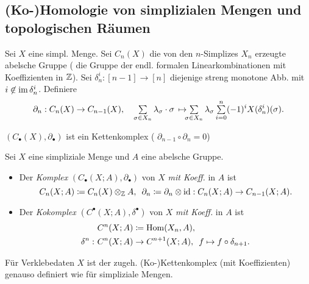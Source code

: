 \documentclass{cheat-sheet}
\newcommand{\nspace}[1]{\foreach \i in {1,...,#1}{ \! }} %
\begin{document}
\begin{samepage}
  \subsection{(Ko-)Homologie von simplizialen Mengen und topologischen Räumen}
\end{samepage}

\begin{defn}
  Sei $X$ eine simpl. Menge. Sei $C_n(X)$ die von den $n$-Simplizes $X_n$ erzeugte abelsche Gruppe (\dh{} die Gruppe der endl. formalen Linearkombinationen mit Koeffizienten in $\mathbb{Z}$). Sei $\delta_n^i : [n{-}1] \to [n]$ diejenige streng monotone Abb. mit $i \not\in \operatorname{im} \delta_n^i$. Definiere
  \[
    \partial_n : C_n(X) \to C_{n-1}(X), \quad
    \sum_{\sigma \in X_n} \lambda_\sigma \cdot \sigma \, \mapsto \nspace{3} \sum_{\sigma \in X_n} \lambda_\sigma \sum_{i=0}^n (-1)^i X(\delta_n^i)(\sigma).
  \]
\end{defn}

\begin{prop}
  $(C_\bullet(X),\partial_\bullet)$ ist ein Kettenkomplex (\dh{} $\partial_{n-1} \circ \partial_n = 0$)
\end{prop}

\begin{defn}
  Sei $X$ eine simpliziale Menge und $A$ eine abelsche Gruppe.
  \begin{itemize}
    \item Der \emph{Komplex} $(C_\bullet(X; A), \partial_\bullet)$ von $X$ \emph{mit Koeff.} in $A$ ist
    \[
      C_n(X; A) \coloneqq C_n(X) \otimes_{\mathbb{Z}} A, \enspace
      \partial_n \coloneqq \partial_n \otimes \operatorname{id} : C_n(X; A) \to C_{n-1}(X; A).
    \]
    \item Der \emph{Kokomplex} $(C^\bullet(X; A), \delta^\bullet)$ von $X$ \emph{mit Koeff.} in $A$ ist
    \begin{align*}
      & C^n(X; A) \coloneqq \operatorname{Hom}(X_n, A), \\
      \delta^n : \,\, & C^n(X; A) \to C^{n+1}(X; A), \enspace f \mapsto f \circ \delta_{n+1}.
    \end{align*}
  \end{itemize}
\end{defn}

\begin{defn}
  Für Verklebedaten $X$ ist der zugeh. (Ko-)Kettenkomplex (mit Koeffizienten) genauso definiert wie für simpliziale Mengen.
\end{defn}
\end{document}

